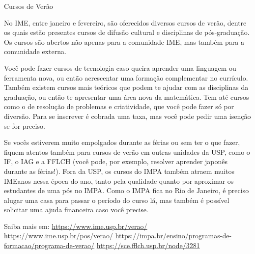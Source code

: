 \begin{secao}{Cursos de Verão}

No IME, entre janeiro e fevereiro, são oferecidos diversos cursos de verão,
dentre os quais estão presentes cursos de difusão cultural e disciplinas de
pós-graduação. Os cursos são abertos não apenas para a comunidade IME, mas
também para a comunidade externa.

Você pode fazer cursos de tecnologia caso queira aprender uma linguagem ou 
ferramenta nova, ou então acrescentar uma formação complementar no currículo. 
Também existem cursos mais teóricos que podem te ajudar com as disciplinas da 
graduação, ou então te apresentar uma área nova da matemática. Tem até cursos como
o de resolução de problemas e criatividade, que você pode fazer só por diversão. 
Para se inscrever é cobrada uma taxa, mas você pode pedir uma isenção se for preciso. 

Se vocês estiverem muito empolgados durante as férias ou sem ter o que fazer, 
fiquem atentos também para cursos de verão em outras unidades da USP, como o IF, o IAG 
e a FFLCH (você pode, por exemplo, resolver aprender japonês durante as férias!). Fora da 
USP, os cursos do IMPA também atraem muitos IMEanos nessa época do ano, tanto pela qualidade 
quanto por aproximar os estudantes de uma pós no IMPA. Como o IMPA fica no Rio de Janeiro, 
é preciso alugar uma casa para passar o período do curso lá, mas também é possível solicitar 
uma ajuda financeira caso você precise.


Saiba mais em: 
\url{https://www.ime.usp.br/verao/}
\url{https://www.ime.usp.br/pos/verao/}
\url{https://impa.br/ensino/programas-de-formacao/programa-de-verao/}
\url{https://sce.fflch.usp.br/node/3281}

\end{secao}
